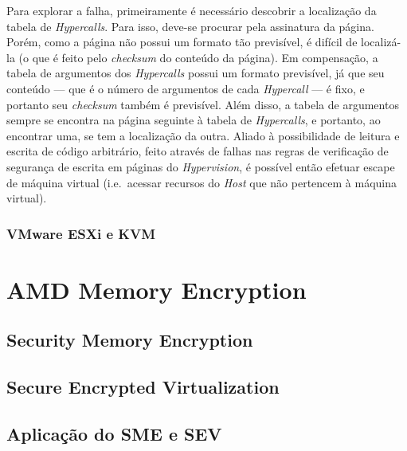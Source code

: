 \documentclass{report}
\begin{document}
Para explorar a falha, primeiramente é necessário descobrir a localização da
tabela de \textit{Hypercalls}. Para isso, deve-se procurar pela assinatura da
página. Porém, como a página não possui um formato tão previsível, é difícil de
localizá-la (o que é feito pelo \textit{checksum} do conteúdo da página). Em
compensação, a tabela de argumentos dos \textit{Hypercalls} possui um formato
previsível, já que seu conteúdo --- que é o número de argumentos de cada
\textit{Hypercall} --- é fixo, e portanto seu \textit{checksum} também é
previsível. Além disso, a tabela de argumentos sempre se encontra na página
seguinte à tabela de \textit{Hypercalls}, e portanto, ao encontrar uma, se tem
a localização da outra. Aliado à possibilidade de leitura e escrita de código
arbitrário, feito através de falhas nas regras de verificação de segurança de
escrita em páginas do \textit{Hypervision}, é possível então efetuar escape de
máquina virtual (i.e.\ acessar recursos do \textit{Host} que não pertencem à
máquina virtual).

\subsection{VMware ESXi e KVM}

\chapter{AMD Memory Encryption}

\section{Security Memory Encryption}

\section{Secure Encrypted Virtualization}

\section{Aplicação do SME e SEV}

\section{}


\nocite{*}

\end{document}
